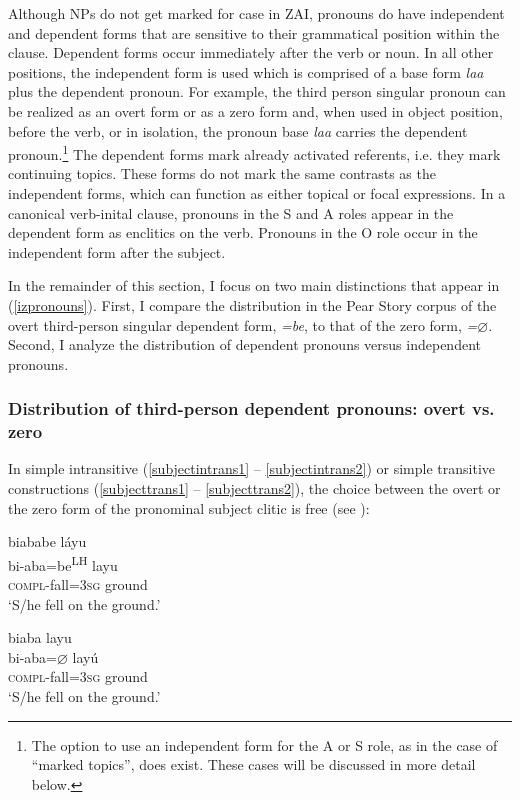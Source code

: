 Although NPs do not get marked for case in ZAI, pronouns do have independent and dependent forms that are sensitive to their grammatical position within the clause. Dependent forms occur immediately after the verb or noun. In all other positions, the independent form is used which is comprised of a base form \textit{laa} plus the dependent pronoun. For example, the third person singular pronoun can be realized as an overt form or as a zero form and, when used in object position, before the verb, or in isolation, the pronoun base \textit{laa} carries the dependent pronoun.\footnote{The option to use an independent form for the A or S role, as in the case of ``marked topics'', does exist. These cases will be discussed in more detail below.} The dependent forms mark already activated referents, i.e. they mark continuing topics. These forms do not mark the same contrasts as the independent forms, which can function as either topical or focal expressions. In a canonical verb-inital clause, pronouns in the S and A roles appear in the dependent form as enclitics on the verb. Pronouns in the O role occur in the independent form after the subject.

In the remainder of this section, I focus on two main distinctions that appear  in (\ref{izpronouns}). First, I compare the distribution in the Pear Story corpus of the overt third-person singular dependent form, \textit{=be}, to that of the zero form, \textit{=$\varnothing$}. Second, I analyze the distribution of dependent pronouns versus independent pronouns. 


\subsubsection{Distribution of third-person dependent pronouns: overt vs. zero}

In simple intransitive (\ref{subjectintrans1} -- \ref{subjectintrans2}) or simple transitive constructions (\ref{subjecttrans1} -- \ref{subjecttrans2}), the choice between the overt or the zero form of the pronominal subject clitic is free (see \citet{marlett1996}):

\ea\label{subjectintrans1}
\glll biababe l\'{a}yu \\
bi-aba=be\textsuperscript{LH} layu \\
\textsc{compl}-fall=3\textsc{sg} ground \\
\glt `S/he fell on the ground.'
\z

\ea\label{subjectintrans2}
\glll biaba layu \\
bi-aba=$\varnothing$ lay\'{u} \\
\textsc{compl}-fall=3\textsc{sg} ground \\
\glt `S/he fell on the ground.'
\z

